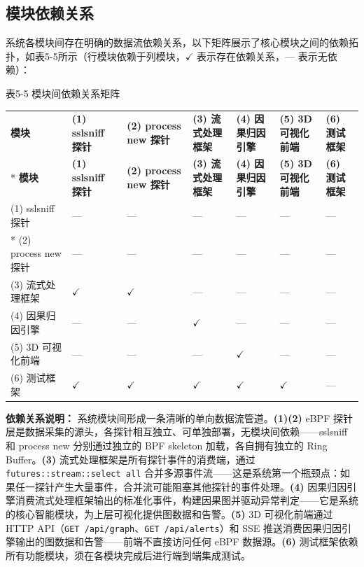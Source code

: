 \documentclass[a4paper]{ctexart}
\makeatletter
\renewcommand{\_}{%
  \ifmmode
    \nfss@text{\textunderscore}%
  \else
    \textunderscore\discretionary{}{}{}%
  \fi}
\makeatother
\begin{document}
\subsection{模块依赖关系}



系统各模块间存在明确的数据流依赖关系，以下矩阵展示了核心模块之间的依赖拓扑，如表5-5所示（行模块依赖于列模块，$\checkmark$ 表示存在依赖关系，— 表示无依赖）：




\medskip
{\centering\small
表5-5 模块间依赖关系矩阵\par
\vspace{3pt}
\setlength{\tabcolsep}{6pt}
\renewcommand{\arraystretch}{1.1}
\begin{longtable}{p{4.4cm} >{\raggedright\arraybackslash}p{1.5cm} >{\raggedright\arraybackslash}p{1.5cm} >{\raggedright\arraybackslash}p{1.5cm} >{\raggedright\arraybackslash}p{1.5cm} >{\raggedright\arraybackslash}p{1.5cm} >{\raggedright\arraybackslash}p{1.5cm}}
\hline
\textbf{模块} & \textbf{(1) sslsniff 探针} & \textbf{(2) process\_new 探针} & \textbf{(3) 流式处理框架} & \textbf{(4) 因果归因引擎} & \textbf{(5) 3D 可视化前端} & \textbf{(6) 测试框架} \\*
\hline
\endfirsthead
\hline
\textbf{模块} & \textbf{(1) sslsniff 探针} & \textbf{(2) process\_new 探针} & \textbf{(3) 流式处理框架} & \textbf{(4) 因果归因引擎} & \textbf{(5) 3D 可视化前端} & \textbf{(6) 测试框架} \\
\hline
\endhead
\hline
\endfoot
\hline
\endlastfoot
(1) sslsniff 探针 & — & — & — & — & — & — \\*
\hline
(2) process\_new 探针 & — & — & — & — & — & — \\
\hline
(3) 流式处理框架 & $\checkmark$ & $\checkmark$ & — & — & — & — \\
\hline
(4) 因果归因引擎 & — & — & $\checkmark$ & — & — & — \\
\hline
(5) 3D 可视化前端 & — & — & — & $\checkmark$ & — & — \\
\hline
(6) 测试框架 & $\checkmark$ & $\checkmark$ & $\checkmark$ & $\checkmark$ & $\checkmark$ & — \\
\hline
\end{longtable}
\par}



\textbf{依赖关系说明：} 系统模块间形成一条清晰的单向数据流管道。\textbf{(1)(2)} eBPF 探针层是数据采集的源头，各探针相互独立、可单独部署，无模块间依赖——sslsniff 和 process\_new 分别通过独立的 BPF skeleton 加载，各自拥有独立的 Ring Buffer。\textbf{(3)} 流式处理框架是所有探针事件的消费端，通过 \texttt{futures::stream::select\_all} 合并多源事件流——这是系统第一个瓶颈点：如果任一探针产生大量事件，合并流可能阻塞其他探针的事件处理。\textbf{(4)} 因果归因引擎消费流式处理框架输出的标准化事件，构建因果图并驱动异常判定——它是系统的核心智能模块，为上层可视化提供图数据和告警。\textbf{(5)} 3D 可视化前端通过 HTTP API（\texttt{GET /api/graph}、\texttt{GET /api/alerts}）和 SSE 推送消费因果归因引擎输出的图数据和告警——前端不直接访问任何 eBPF 数据源。\textbf{(6)} 测试框架依赖所有功能模块，须在各模块完成后进行端到端集成测试。
\end{document}
